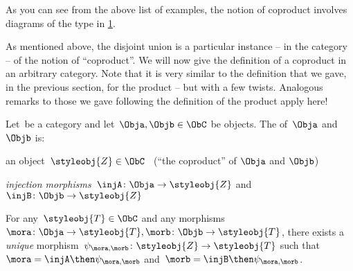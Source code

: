 As you can see from the above list of examples, the notion of coproduct involves diagrams of the type in \cref{fig:prod_generic}. 

  \begin{figure}[h!]
  \begin{center}
  \end{center}
  \caption{}
    \label{fig:prod_generic}
  \end{figure}


As mentioned above, the disjoint union is a particular instance -- in the category \Set  -- of the notion of ``coproduct''.
We will now give the definition of a coproduct in an arbitrary category. Note that it is very similar to the definition that we gave, in the previous section, for the product -- but with a few twists. Analogous remarks to those we gave following the definition of the product apply here!

\begin{ctdefinition}[Coproduct]
  \label{def:catcoproduct}
  Let~\CatC be a category and let~$\Obja, \Objb \in \ObC$ be objects. The \emph{} of~$\Obja$ and~$\Objb$ is:  \\
  \constit
  \begin{compactenum}
    \item an object~$\styleobj{Z} \in \ObC$ \ (``the coproduct'' of $\Obja$ and $\Objb$)
    \item \emph{injection morphisms}~$\injA \colon \Obja \to \styleobj{Z} $ and~$\injB \colon \Objb \to \styleobj{Z} $
  \end{compactenum}
  \condit
  \begin{compactenum}
    \item For any~$\styleobj{T} \in \ObC$ and any morphisms $\mora \colon  \Obja \to \styleobj{T}, \morb \colon \Objb \to \styleobj{T}$, there exists a \emph{unique} morphism~$\psi_{\mora, \morb} \colon \styleobj{Z} \to \styleobj{T}$ such that~$\mora = \injA\then \psi_{\mora, \morb}$ and~$\morb = \injB \then \psi_{\mora,\morb}$.
  \end{compactenum}
\end{ctdefinition}


